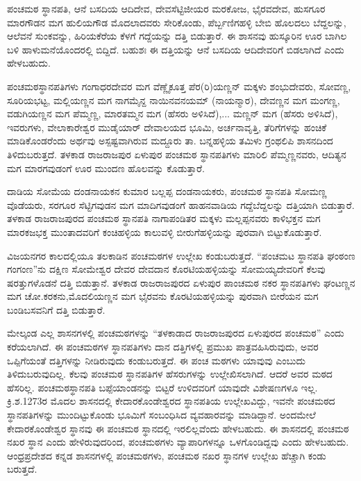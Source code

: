 ಪಂಚಮಠ ಸ್ಥಾನಪತಿ, ಆನೆ ಬಸದಿಯ ಆದಿದೇವ, ದೇವಸೆಟ್ಟಿಜೀಯರ ಮರಕೋಜ, ಭೈರವದೇವ, ಹುಸಗೂರ ಮಾರಗೌಡನ ಮಗ ಹುಲಿಯಗೌಡ ಮೊದಲಾದವರು ಸೇರಿಕೊಂಡು, ಪೆರ್ಬ್ಬಣಿಗಹಳ್ಳಿ ಬೇಬಿ ಹೊಲದಲು ಬೆದ್ದಲನ್ನು, ಆಲೆವನೆ ಸುಂಕವನ್ನು, ಹಿರಿಯಕೆರೆಯ ಕೆಳಗೆ ಗದ್ದೆಯನ್ನು ದತ್ತಿ ಬಿಡುತ್ತಾರೆ. ಈ ಶಾಸನವು ಹುಸ್ಕೂರಿನ ಊರ ಬಾಗಿಲ ಬಳಿ ಹಾಳುಮನೆಯೊಂದರಲ್ಲಿ ಬಿದ್ದಿದೆ. ಬಹುಶಃ ಈ ದತ್ತಿಯನ್ನು ಆನೆ ಬಸದಿಯ ಆದಿದೇವರಿಗೆ ಬಿಡಲಾಗಿದೆ ಎಂದು ಹೇಳಬಹುದು.

ಪಂಚಮಠಸ್ಥಾನಪತಿಗಳು ಗಂಗಾಧರದೇವರ ಮಗ ವೆಣ್ಣೈಕೂತ್ತ ಪೆರ(ರಿ)ಯಣ್ಣನ್​ ಮಕ್ಕಳು ಶಂಭುದೇವರು, ಸೋವಣ್ಣ, ಸೂರಿಯಭಟ್ಟ, ಮಲ್ಲಿಯಣ್ಣನ ಮಗ ನಾಗಮೈನ್ದ ನಾಯಿನವನಯಮ್ (ನಾಯನ್ಮಾರ), ದೇವಣ್ಣನ ಮಗ ಮಂಗಣ್ಣ, ವಡುಗಿಯಣ್ಣನ ಮಗ ಪೆಮ್ಮಣ್ಣ, ಮಾರತಮ್ಮನ ಮಗ (ಹೆಸರು ಅಳಿಸಿದೆ),... ಮಣ್ಣನ್​ ಮಗ (ಹೆಸರು ಅಳಿಸಿದೆ), ಇವರುಗಳು, ವೇಲಾಕಾರೇಶ್ವರ ಮುಡೈಯಾರ್​ ದೇವಾಲಯದ ಭೂಮಿ, ಅರ್ಚನಾವೃತ್ತಿ, ತೆರಿಗೆಗಳನ್ನು ಹಂಚಿಕೆ ಮಾಡಿಕೊಂಡರೆಂದು ಅರ್ಥವು ಅಸ್ಪಷ್ಟವಾಗಿರುವ ಮದ್ದೂರು ತಾ. ಬನ್ನಹಳ್ಳಿಯ ತಮಿಳು ಗ್ರಂಥಲಿಪಿ ಶಾಸನದಿಂದ ತಿಳಿದುಬರುತ್ತದೆ. ತಳಕಾಡ ರಾಜರಾಜಪುರ ಏಳುಪುರ ಪಂಚಮಠ ಸ್ಥಾನಪತಿಗಳು ಮಾರಿಲಿ ಪೆಮ್ಮಣ್ಣನವರು, ಆದಿತ್ಯನ ಮಗ ಮಾರಗವುಡಂಗೆ ಊರ ಮುಂದಣ ಹೊಲವನ್ನು ಕೊಡುತ್ತಾರೆ.

ದಾಡಿಯ ಸೋಮೆಯ ದಂಡನಾಯಕನ ಕುಮಾರ ಬಲ್ಲಪ್ಪ ದಂಡನಾಯಕರು, ಪಂಚಮಠ ಸ್ಥಾನಪತಿ ಸೋಮಣ್ಣ ವೊಡೆಯರು, ಸರಗೂರ ಸೆಟ್ಟಿಗವುಡನ ಮಗ ಮಾದಿಗವುಡಂಗೆ ಹಾಹನವಾಡಿಯ ಗದ್ದೆಬೆದ್ದಲನ್ನು ದತ್ತಿಯಾಗಿ ಬಿಡುತ್ತಾರೆ. ತಳಕಾಡ ರಾಜರಾಜಪುರದ ಪಂಚಮಠ ಸ್ಥಾನಪತಿ ನಾಗಾಪಂಡಿತರ ಮಕ್ಕಳು ಮಲ್ಲಪ್ಪನವರು ಕಾಳಿಭಕ್ತನ ಮಗ ಮಾರಕಜಭಕ್ತ ಮುಂತಾದವರಿಗೆ ಕಂಚಿಹಳ್ಳಿಯ ಕಾಲುವಳ್ಳಿ ಬೀರುಗೆಹಳ್ಳಿಯನ್ನು ಪುರವಾಗಿ ಬಿಟ್ಟುಕೊಡುತ್ತಾರೆ.

ವಿಜಯನಗರ ಕಾಲದಲ್ಲಿಯೂ ತಲಕಾಡಿನ ಪಂಚಮಠಗಳ ಉಲ್ಲೇಖ ಕಂಡುಬರುತ್ತದೆ. “ಪಂಚಮಟ ಸ್ಥಾನಪತಿ ಘಂಠಂಣ ಗಂಗಂಣ”ನು ದಕ್ಷಿಣ ಸೋಮೇಶ್ವರ ದೇವರ ದೇವದಾನ ಕೊರಟಿಯಹಳ್ಳಿಯನ್ನು ಸೋಮಯ್ಯದೇವರಿಗೆ ಕೆಲವು ಷರತ್ತುಗಳೊಡನೆ ದತ್ತಿ ಬಿಡುತ್ತಾನೆ. ತಳಕಾಡ ರಾಜರಾಜಪುರದ ಏಳುಪುರ ಪಾಂಚಮಠ ನಕರ ಸ್ಥಾನಪತಿಗಳು ಘಂಟಣ್ಣನ ಮಗ ಚೋ.ಕರಕನು,ಮೊದಲಿಯಣ್ಣನ ಮಗ ಭೈರವನು ಕೊರಟಿಯಹಳ್ಳಿಯನ್ನು ಪುರವಾಗಿ ಬೀರೆಯನ ಮಗ ಬಂಡಿಬಸವನಿಗೆ ದತ್ತಿ ಬಿಡುತ್ತಾರೆ.

ಮೇಲ್ಕಂಡ ಎಲ್ಲ ಶಾಸನಗಳಲ್ಲಿ ಪಂಚಮಠಗಳನ್ನು “ತಳಕಾಡಾದ ರಾಜರಾಜಪುರದ ಏಳುಪುರದ ಪಂಚಮಠ” ಎಂದು ಕರೆಯಲಾಗಿದೆ. ಈ ಪಂಚಮಠಗಳ ಸ್ಥಾನಪತಿಗಳು ದಾನ ದತ್ತಿಗಳಲ್ಲಿ ಪ್ರಮುಖ ಪಾತ್ರವಹಿಸಿರುವುದು, ಅವರ ಒಪ್ಪಿಗೆಯಂತೆ ದತ್ತಿಗಳನ್ನು ನೀಡಿರುವುದು ಕಂಡುಬರುತ್ತದೆ. ಈ ಪಂಚ ಮಠಗಳು ಯಾವುವು ಎಂಬುದು ತಿಳಿದುಬರುವುದಿಲ್ಲ. ಕೆಲವು ಪಂಚಮಠ ಸ್ಥಾನಪತಿಗಳ ಹೆಸರುಗಳನ್ನು ಉಲ್ಲೇಖಿಸಲಾಗಿದೆ. ಆದರೆ ಅವರ ಮಠದ ಹೆಸರಿಲ್ಲ. ಪಂಚಮಠಸ್ಥಾನಪತಿ ಬಪ್ಪೆಯಾಂಡನನ್ನು ಬಿಟ್ಟರೆ ಉಳಿದವರಿಗೆ ಯಾವುದೇ ವಿಶೇಷಣಗಳೂ ಇಲ್ಲ. ಕ್ರಿ.ಶ.1273ರ ಮೊದಲ ಶಾಸನದಲ್ಲಿ ಕೇದಾರಕೊಂಡೇಶ್ವರದ ಸ್ಥಾನಪತಿಯ ಉಲ್ಲೇಖವಿದ್ದು, ಇವನೇ ಪಂಚಮಠದ ಸ್ಥಾನಪತಿಗಳನ್ನು ಮುಂದಿಟ್ಟುಕೊಂಡು ಭೂಮಿಗೆ ಸಂಬಂಧಿಸಿದ ವ್ಯವಹಾರವನ್ನು ಮಾಡಿದ್ದಾನೆ. ಅಂದಮೇಲೆ ಕೇದಾರಕೊಂಡೇಶ್ವರ ಸ್ಥಾನವು ಈ ಪಂಚಮಠ ಸ್ಥಾನದಲ್ಲಿ ಇರಲಿಲ್ಲವೆಂದು ಹೇಳಬಹುದು. ಈ ಶಾಸನದಲ್ಲಿ ಪಂಚಮಠ ನಖರ ಸ್ಥಾನ ಎಂದು ಹೇಳಿರುವುದರಿಂದ, ಪಂಚಮಠಗಳು ವ್ಯಾಪಾರಿಗಳನ್ನೂ ಒಳಗೊಂಡಿದ್ದವು ಎಂದು ಹೇಳಬಹುದು. ಆಂಧ್ರಪ್ರದೇಶದ ಕನ್ನಡ ಶಾಸನಗಳಲ್ಲಿ ಪಂಚಮಠಗಳು, ಪಂಚಮಠ ನಖರ ಸ್ಥಾನಗಳ ಉಲ್ಲೇಖ ಹೆಚ್ಚಾಗಿ ಕಂಡು ಬರುತ್ತದೆ.

